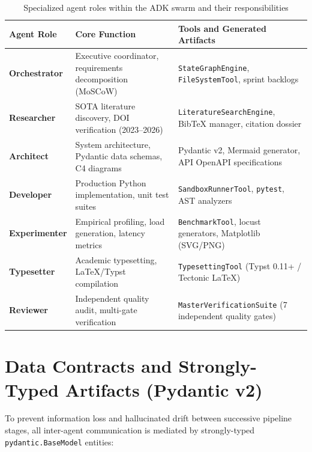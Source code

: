 \begin{table}[H]
\centering
\small
\caption{Specialized agent roles within the ADK swarm and their responsibilities}
\label{tab:agent_roles}
\begin{tabularx}{\textwidth}{l p{4.5cm} X}
\toprule
\textbf{Agent Role} & \textbf{Core Function} & \textbf{Tools and Generated Artifacts} \\
\midrule
\textbf{Orchestrator} & Executive coordinator, requirements decomposition (MoSCoW) & \texttt{StateGraphEngine}, \texttt{FileSystemTool}, sprint backlogs \\
\textbf{Researcher} & SOTA literature discovery, DOI verification (2023--2026) & \texttt{LiteratureSearchEngine}, BibTeX manager, citation dossier \\
\textbf{Architect} & System architecture, Pydantic data schemas, C4 diagrams & Pydantic v2, Mermaid generator, API OpenAPI specifications \\
\textbf{Developer} & Production Python implementation, unit test suites & \texttt{SandboxRunnerTool}, \texttt{pytest}, AST analyzers \\
\textbf{Experimenter} & Empirical profiling, load generation, latency metrics & \texttt{BenchmarkTool}, locust generators, Matplotlib (SVG/PNG) \\
\textbf{Typesetter} & Academic typesetting, LaTeX/Typst compilation & \texttt{TypesettingTool} (Typst 0.11+ / Tectonic LaTeX) \\
\textbf{Reviewer} & Independent quality audit, multi-gate verification & \texttt{MasterVerificationSuite} (7 independent quality gates) \\
\bottomrule
\end{tabularx}
\end{table}

\section{Data Contracts and Strongly-Typed Artifacts (Pydantic v2)}
\label{sec:data_contracts}

To prevent information loss and hallucinated drift between successive pipeline stages, all inter-agent communication is mediated by strongly-typed \texttt{pydantic.BaseModel} entities:


